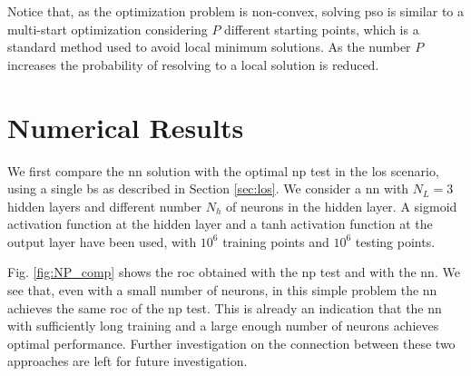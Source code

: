 \documentclass[conference,draftcls,onecolumn]{IEEEtran}
\begin{document}


      
    

Notice that, as the optimization problem is non-convex, solving \ac{pso} is similar to a multi-start optimization considering $P$ different starting points, which is a standard method used to avoid local minimum solutions. As the number $P$ increases the probability of resolving to a local solution is reduced.

\section{Numerical Results}\label{sec: nr}

We first compare the \ac{nn} solution with the optimal \ac{np} test in the \ac{los} scenario, using a single \ac{bs} as described in Section \ref{sec:los}. We consider a \ac{nn} with $N_L=3$ hidden layers and different number $N_h$ of neurons in the hidden layer. A sigmoid activation function at the hidden layer and a tanh activation function at the output layer have been used, with $10^6$ training points  and $10^6$ testing points. 

Fig. \ref{fig:NP_comp} shows the \ac{roc} obtained with the \ac{np} test and with the \ac{nn}. We see that, even with a small number of neurons, in this simple problem the \ac{nn} achieves the same \ac{roc} of the \ac{np} test. This is already an indication that the \ac{nn} with sufficiently long training and a large enough number of neurons achieves optimal performance. Further investigation on the connection between these two approaches are left for future  investigation.
 
\end{document}
